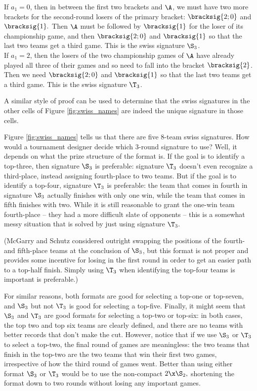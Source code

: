 {{         If $a_1 = 0$, then in between the first two brackets and $\A$, we must have two more brackets for the second-round losers of the primary bracket: $\bracksig{2;0}$ and $\bracksig{1}.$ Then $\A$ must be followed by $\bracksig{1}$ for the loser of its championship game, and then $\bracksig{2;0}$ and $\bracksig{1}$ so that the last two teams get a third game. This is the swiss signature $\S_3$.\\
        
         If $a_1 = 2$, then the losers of the two championship games of $\A$ have already played all three of their games and so need to fall into the bracket $\bracksig{2}$. Then we need $\bracksig{2;0}$ and $\bracksig{1}$ so that the last two teams get a third game. This is the swiss signature $\T_3$.
        }{}

A similar style of proof can be used to determine that the swiss signatures in the other cells of Figure \ref{fig:swiss_names} are indeed the unique signature in those cells.

Figure \ref{fig:swiss_names} tells us that there are five $8$-team swiss signatures. How would a tournament designer decide which 3-round signature to use? Well, it depends on what the prize structure of the format is. If the goal is to identify a top-three, then signature $\S_3$ is preferable: signature $\T_3$ doesn't even recognize a third-place, instead assigning fourth-place to two teams. But if the goal is to identify a top-four, signature $\T_3$ is preferable: the team that comes in fourth in signature $\S_3$ actually finishes with only one win, while the team that comes in fifth finishes with two. While it is still reasonable to grant the one-win team fourth-place -- they had a more difficult slate of opponents -- this is a somewhat messy situation that is solved by just using signature $\T_3.$

(McGarry and Schutz \cite{four_five_swap} considered outright swapping the positions of the fourth- and fifth-place teams at the conclusion of $\S_3$, but this format is not proper and provides some incentive for losing in the first round in order to get an easier path to a top-half finish. Simply using $\T_3$ when identifying the top-four teams is important is preferable.)

For similar reasons, both formats are good for selecting a top-one or top-seven, and $\S_3$ but not $\T_3$ is good for selecting a top-five. Finally, it might seem that $\S_3$ and $\T_3$ are good formats for selecting a top-two or top-six: in both cases, the top two and top six teams are clearly defined, and there are no teams with better records that don't make the cut. However, notice that if we use $\S_3$ or $\T_3$ to select a top-two, the final round of games are meaningless: the two teams that finish in the top-two are the two teams that win their first two games, irrespective of how the third round of games went. Better than using either format $\S_3$ or $\T_3$ would be to use the non-compact $2\x\S_2,$ shortening the format down to two rounds without losing any important games.

}
